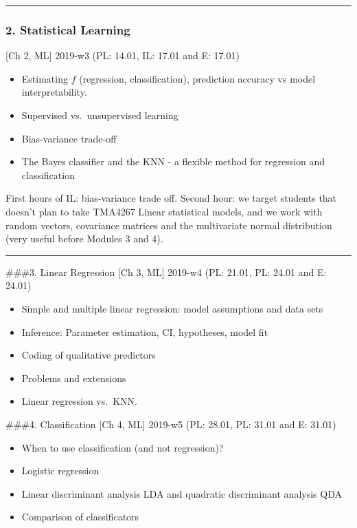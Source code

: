 \documentclass[]{article}
\providecommand{\tightlist}{%
  \setlength{\itemsep}{0pt}\setlength{\parskip}{0pt}}
\begin{document}
\begin{center}\rule{0.5\linewidth}{\linethickness}\end{center}

\hypertarget{statistical-learning}{%
\subsubsection{2. Statistical Learning}\label{statistical-learning}}

{[}Ch 2, ML{]} 2019-w3 (PL: 14.01, IL: 17.01 and E: 17.01)

\begin{itemize}
\tightlist
\item
  Estimating \(f\) (regression, classification), prediction accuracy vs
  model interpretability.
\item
  Supervised vs.~unsupervised learning
\item
  Bias-variance trade-off
\item
  The Bayes classifier and the KNN - a flexible method for regression
  and classification
\end{itemize}

First hours of IL: bias-variance trade off. Second hour: we target
students that doesn't plan to take TMA4267 Linear statistical models,
and we work with random vectors, covariance matrices and the
multivariate normal distribution (very useful before Modules 3 and 4).

\begin{center}\rule{0.5\linewidth}{\linethickness}\end{center}

\#\#\#3. Linear Regression {[}Ch 3, ML{]} 2019-w4 (PL: 21.01, PL: 24.01
and E: 24.01)

\begin{itemize}
\tightlist
\item
  Simple and multiple linear regression: model assumptions and data sets
\item
  Inference: Parameter estimation, CI, hypotheses, model fit
\item
  Coding of qualitative predictors
\item
  Problems and extensions
\item
  Linear regression vs.~KNN.
\end{itemize}

\#\#\#4. Classification {[}Ch 4, ML{]} 2019-w5 (PL: 28.01, PL: 31.01 and
E: 31.01)

\begin{itemize}
\tightlist
\item
  When to use classification (and not regression)?
\item
  Logistic regression
\item
  Linear discriminant analysis LDA and quadratic discriminant analysis
  QDA
\item
  Comparison of classificators
\end{itemize}
\end{document}
